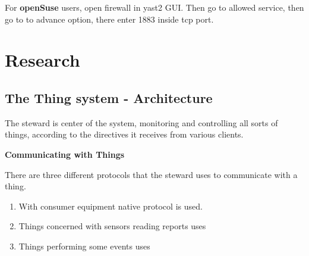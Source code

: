 \documentclass[16pt]{article}
\begin{document}
For \textbf{openSuse} users, open firewall in yast2 GUI. Then go to
allowed service, then go to to advance option, there enter 1883 inside
tcp port.

  
\vspace{8cm}

\section{Research}
\vspace{0.5cm}



\subsection{The Thing system - Architecture}


\vspace{0.5cm}

The steward is center of the system, monitoring and controlling all
sorts of things, according to the directives it receives from various
clients.
\vspace{0.5cm}

{\Large{\textbf{Communicating with
Things}}}


There are three different protocols that the steward uses to communicate
with a thing. 

\begin{enumerate}


\item With consumer equipment native protocol is used.
\item Things concerned with sensors reading reports uses
\item Things performing some events uses

\end{enumerate}
\end{document}
